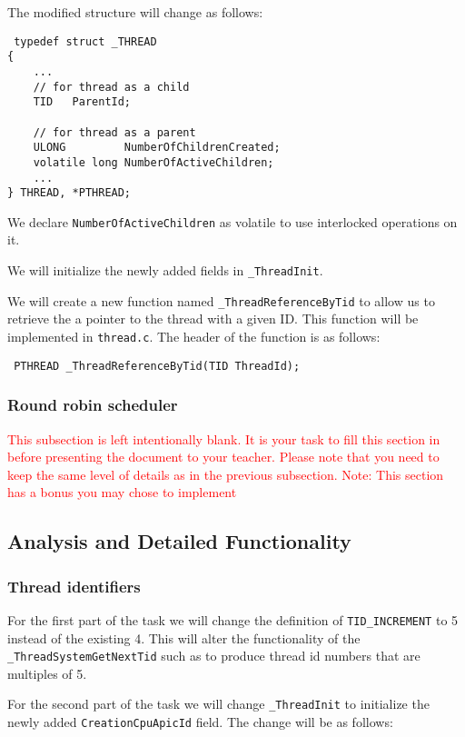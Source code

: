The modified structure will change as follows:
\begin{lstlisting}
 typedef struct _THREAD
{
    ...
    // for thread as a child
    TID   ParentId;
    
    // for thread as a parent
    ULONG         NumberOfChildrenCreated;
    volatile long NumberOfActiveChildren;
    ...
} THREAD, *PTHREAD;
\end{lstlisting}

We declare \lstinline{NumberOfActiveChildren} as volatile to use interlocked operations on it. 


We will initialize the newly added fields in \lstinline|_ThreadInit|. 

We will create a new function named \lstinline|_ThreadReferenceByTid| to allow us to retrieve the a pointer to the thread with a given ID. This function will be implemented in \lstinline|thread.c|. The header of the function is as follows:
\begin{lstlisting}
 PTHREAD _ThreadReferenceByTid(TID ThreadId);
\end{lstlisting}

\subsubsection{Round robin scheduler}
  \textcolor{red}{This subsection is left intentionally blank. It is your task to fill this section in before presenting the document to your teacher. Please note that you need to keep the same level of details as in the previous subsection. Note: This section has a bonus you may chose to implement}
  
\subsection{Analysis and Detailed Functionality}
\subsubsection{Thread identifiers}

For the first part of the task we will change the definition of \lstinline|TID_INCREMENT| to 5 instead of the existing 4. This will alter the functionality of the \lstinline|_ThreadSystemGetNextTid| such as to produce thread id numbers that are multiples of 5. 

For the second part of the task we will change \lstinline{_ThreadInit} to initialize the newly added \lstinline|CreationCpuApicId| field. The change will be as follows:

